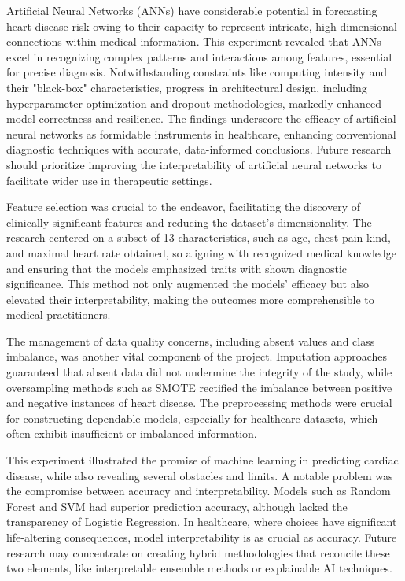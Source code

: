 Artificial Neural Networks (ANNs) have considerable potential in forecasting heart disease risk owing to their capacity to represent intricate, high-dimensional connections within medical information. This experiment revealed that ANNs excel in recognizing complex patterns and interactions among features, essential for precise diagnosis. Notwithstanding constraints like computing intensity and their "black-box" characteristics, progress in architectural design, including hyperparameter optimization and dropout methodologies, markedly enhanced model correctness and resilience. The findings underscore the efficacy of artificial neural networks as formidable instruments in healthcare, enhancing conventional diagnostic techniques with accurate, data-informed conclusions. Future research should prioritize improving the interpretability of artificial neural networks to facilitate wider use in therapeutic settings.

Feature selection was crucial to the endeavor, facilitating the discovery of clinically significant features and reducing the dataset's dimensionality. The research centered on a subset of 13 characteristics, such as age, chest pain kind, and maximal heart rate obtained, so aligning with recognized medical knowledge and ensuring that the models emphasized traits with shown diagnostic significance. This method not only augmented the models' efficacy but also elevated their interpretability, making the outcomes more comprehensible to medical practitioners.

The management of data quality concerns, including absent values and class imbalance, was another vital component of the project. Imputation approaches guaranteed that absent data did not undermine the integrity of the study, while oversampling methods such as SMOTE rectified the imbalance between positive and negative instances of heart disease. The preprocessing methods were crucial for constructing dependable models, especially for healthcare datasets, which often exhibit insufficient or imbalanced information.

This experiment illustrated the promise of machine learning in predicting cardiac disease, while also revealing several obstacles and limits. A notable problem was the compromise between accuracy and interpretability. Models such as Random Forest and SVM had superior prediction accuracy, although lacked the transparency of Logistic Regression. In healthcare, where choices have significant life-altering consequences, model interpretability is as crucial as accuracy. Future research may concentrate on creating hybrid methodologies that reconcile these two elements, like interpretable ensemble methods or explainable AI techniques.

